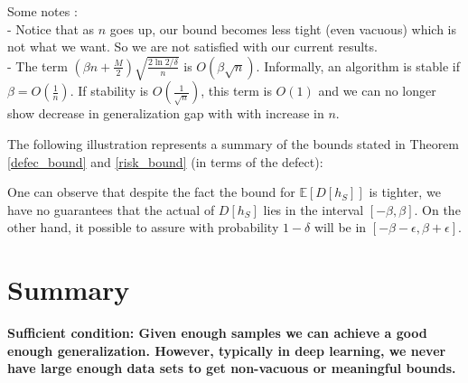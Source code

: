 \documentclass{article}
\begin{document}
Some notes :\\
- Notice that as $n$ goes up, our bound becomes less tight (even vacuous) which is not what we want. So we are not satisfied with our current results.\\
- The term $(\beta n + \frac{M}{2})\sqrt{\frac{2\ln{2/\delta}}{n}}$ is $O(\beta\sqrt{n})$. Informally, an algorithm is stable if $\beta=O(\frac{1}{n})$. If stability is $O(\frac{1}{\sqrt{n}})$, this term is $O(1)$ and we can no longer show decrease in generalization gap with with increase in $n$.


The following illustration represents a summary of the bounds stated in Theorem \ref{defec_bound} and \ref{risk_bound} (in terms of the defect):
\begin{figure}[H]\centering
\end{figure}
One can observe that despite the fact the bound for $\mathbb{E}[D[h_S]]$ is tighter, we have no guarantees that the actual of $D[h_S]$ lies in the interval $\left[-\beta, \beta \right]$. On the other hand, it possible to assure with probability $1-\delta$ will be in $\left[-\beta-\epsilon, \beta+\epsilon \right]$.

\section*{Summary}
\textbf{Sufficient condition: Given enough samples we can achieve a good enough generalization.  However, typically in deep learning, we never have large enough data sets to get non-vacuous or meaningful bounds.}
\end{document}
